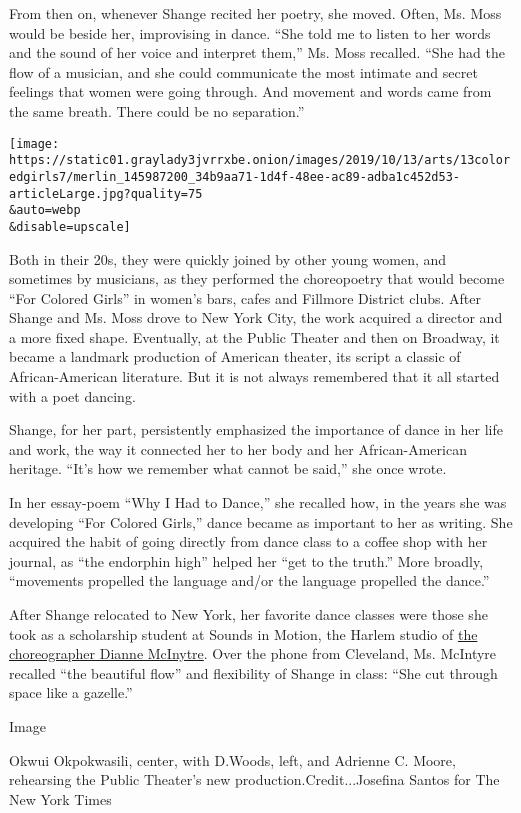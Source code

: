 From then on, whenever Shange recited her poetry, she moved. Often, Ms.
Moss would be beside her, improvising in dance. ``She told me to listen
to her words and the sound of her voice and interpret them,'' Ms. Moss
recalled. ``She had the flow of a musician, and she could communicate
the most intimate and secret feelings that women were going through. And
movement and words came from the same breath. There could be no
separation.''

\texttt{[image: https://static01.graylady3jvrrxbe.onion/images/2019/10/13/arts/13coloredgirls7/merlin\_145987200\_34b9aa71-1d4f-48ee-ac89-adba1c452d53-articleLarge.jpg?quality=75\\\&auto=webp\\\&disable=upscale]}

Both in their 20s, they were quickly joined by other young women, and
sometimes by musicians, as they performed the choreopoetry that would
become ``For Colored Girls'' in women's bars, cafes and Fillmore
District clubs. After Shange and Ms. Moss drove to New York City, the
work acquired a director and a more fixed shape. Eventually, at the
Public Theater and then on Broadway, it became a landmark production of
American theater, its script a classic of African-American literature.
But it is not always remembered that it all started with a poet dancing.

Shange, for her part, persistently emphasized the importance of dance in
her life and work, the way it connected her to her body and her
African-American heritage. ``It's how we remember what cannot be said,''
she once wrote.

In her essay-poem ``Why I Had to Dance,'' she recalled how, in the years
she was developing ``For Colored Girls,'' dance became as important to
her as writing. She acquired the habit of going directly from dance
class to a coffee shop with her journal, as ``the endorphin high''
helped her ``get to the truth.'' More broadly, ``movements propelled the
language and/or the language propelled the dance.''

After Shange relocated to New York, her favorite dance classes were
those she took as a scholarship student at Sounds in Motion, the Harlem
studio of \href{http://www.diannemcintyre.com/}{the choreographer Dianne
McInytre}. Over the phone from Cleveland, Ms. McIntyre recalled ``the
beautiful flow'' and flexibility of Shange in class: ``She cut through
space like a gazelle.''

Image

Okwui Okpokwasili, center, with D.Woods, left, and Adrienne C. Moore,
rehearsing the Public Theater's new production.Credit...Josefina Santos
for The New York Times

